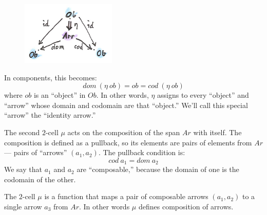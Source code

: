 \begin{figure}[H]
\centering
\includegraphics[width=0.4\textwidth]{images/spanunit.png}
\end{figure}

\noindent
In components, this becomes:
\[dom\ (\eta\ ob) = ob = cod\ (\eta\ ob)\]
where $ob$ is an ``object'' in $Ob$. In other words,
$\eta$ assigns to every ``object'' and ``arrow'' whose domain and
codomain are that ``object.'' We'll call this special ``arrow'' the
``identity arrow.''

The second $2$-cell $\mu$ acts on the composition of the span
$Ar$ with itself. The composition is defined as a pullback, so
its elements are pairs of elements from $Ar$ --- pairs of
``arrows'' $(a_1, a_2)$. The pullback condition is:
\[cod\ a_1 = dom\ a_2\]
We say that $a_1$ and $a_2$ are ``composable,'' because the
domain of one is the codomain of the other.

\begin{figure}[H]
\centering
{}

\end{figure}

\noindent
The $2$-cell $\mu$ is a function that maps a pair of composable
arrows $(a_1, a_2)$ to a single arrow $a_3$ from
$Ar$. In other words $\mu$ defines composition of arrows.

